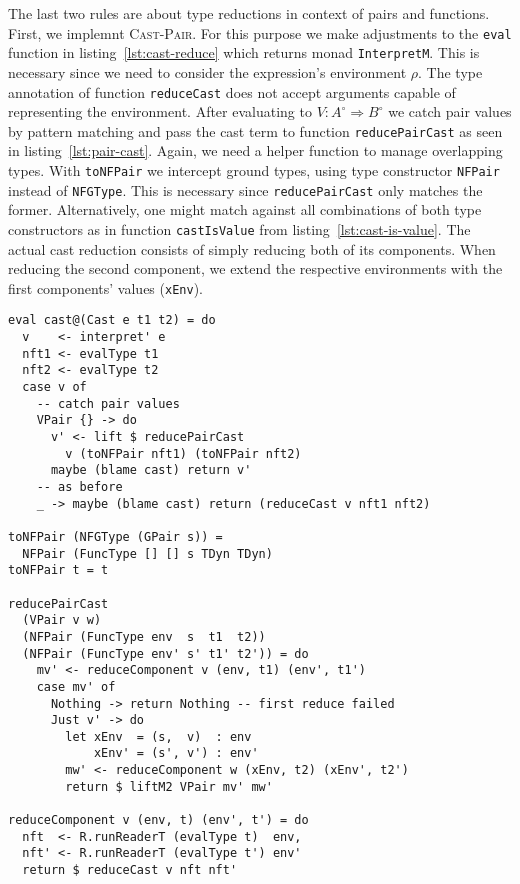 The last two rules are about type reductions in context of pairs and functions. First, we implemnt \textsc{Cast-Pair}. For this purpose we make adjustments to the \texttt{eval} function in listing~\ref{lst:cast-reduce} which returns monad \texttt{InterpretM}. This is necessary since we need to consider the expression's environment $\rho$. The type annotation of function \texttt{reduceCast} does not accept arguments capable of representing the environment. After evaluating to $V : A^\circ \Rightarrow B^\circ$ we catch pair values by pattern matching and pass the cast term to function \texttt{reducePairCast} as seen in listing~\ref{lst:pair-cast}. Again, we need a helper function to manage overlapping types. With \texttt{toNFPair} we intercept ground types, using type constructor \texttt{NFPair} instead of \texttt{NFGType}. This is necessary since \texttt{reducePairCast} only matches the former. Alternatively, one might match against all combinations of both type constructors as in function \texttt{castIsValue} from listing~\ref{lst:cast-is-value}. The actual cast reduction consists of simply reducing both of its components. When reducing the second component, we extend the respective environments with the first components' values (\texttt{xEnv}).

\begin{lstlisting}[float,
  caption=Haskell: Rule \textsc{Cast-Pair} (\texttt{Interpreter.hs}),
  label=lst:pair-cast]
eval cast@(Cast e t1 t2) = do
  v    <- interpret' e
  nft1 <- evalType t1
  nft2 <- evalType t2
  case v of
    -- catch pair values
    VPair {} -> do
      v' <- lift $ reducePairCast
        v (toNFPair nft1) (toNFPair nft2)
      maybe (blame cast) return v'
    -- as before
    _ -> maybe (blame cast) return (reduceCast v nft1 nft2)

toNFPair (NFGType (GPair s)) =
  NFPair (FuncType [] [] s TDyn TDyn)
toNFPair t = t

reducePairCast
  (VPair v w)
  (NFPair (FuncType env  s  t1  t2))
  (NFPair (FuncType env' s' t1' t2')) = do
    mv' <- reduceComponent v (env, t1) (env', t1')
    case mv' of
      Nothing -> return Nothing -- first reduce failed
      Just v' -> do
        let xEnv  = (s,  v)  : env
            xEnv' = (s', v') : env'
        mw' <- reduceComponent w (xEnv, t2) (xEnv', t2')
        return $ liftM2 VPair mv' mw'

reduceComponent v (env, t) (env', t') = do
  nft  <- R.runReaderT (evalType t)  env,
  nft' <- R.runReaderT (evalType t') env'
  return $ reduceCast v nft nft'
\end{lstlisting}

